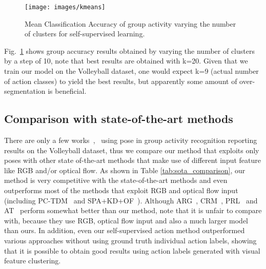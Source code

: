 \documentclass[a4paper,conference]{IEEEtran}
\begin{document}
\begin{figure}
	\texttt{[image: images/kmeans]}
	\caption{\label{fig:kmeans} Mean Classification Accuracy of group activity varying the number of clusters for self-supervised learning. }
\end{figure}
Fig.~\ref{fig:kmeans} shows group accuracy results obtained by varying the number of clusters by a step of 10, note that best results are obtained with k=20. Given that we train our model on the Volleyball dataset, one would expect k=9 (actual number of action classes) to yield the best results, but apparently some amount of over-segmentation is beneficial.





\subsection{Comparison with state-of-the-art methods}
There are only a few works~\cite{azar2018multi},~\cite{cvpr2020transformer}  using pose in group activity recognition reporting results on the Volleyball dataset, thus we compare our method that exploits only poses with other state of-the-art methods that make use of different input feature like RGB and/or optical flow.  As shown in Table \ref{tab:sota_comparison}, our method is very competitive with the state-of-the-art methods and even outperforms most of the methods that exploit RGB and optical flow input (including PC-TDM~\cite{yan2018participation} and SPA+KD+OF~\cite{tang2019learning}). Although ARG~\cite{wu2019learning}, CRM~\cite{mokhtarzadeh2019convolutional}, PRL~\cite{hu2019progressive} and AT~\cite{cvpr2020transformer} perform somewhat better than our method, note that it is unfair to compare with, because they use RGB, optical flow input  and  also  a  much  larger  model  than  ours.   In  addition,  even  our  self-supervised  action  method  outperformed  various  approaches  without using ground truth  individual  action  labels, showing that it is possible to obtain good results using  action labels generated with visual feature clustering. 
\end{document}
